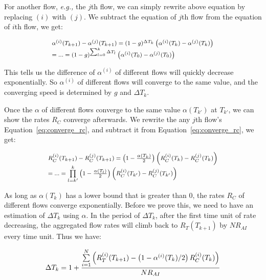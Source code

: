 For another flow, {\em e.g.,} the $j$th flow, we can simply rewrite above equation by replacing 
$(i)$ with $(j)$. We subtract the equation of $j$th flow from the equation of $i$th flow, we get:

\begin{equation}
\small
\begin{array}{l}
{\alpha ^{(i)}}({T_{k + 1}}) - {\alpha ^{(j)}}({T_{k + 1}}) = {(1 - g)^{\Delta {T_k}}}\left( {{\alpha ^{(i)}}({T_k}) - {\alpha ^{(j)}}({T_k})} \right)\\
 = ... = {(1 - g)^{\sum\nolimits_{l = 0}^k {\Delta {T_l}} }}\left( {{\alpha ^{(i)}}({T_0}) - {\alpha ^{(j)}}({T_0})} \right)
\end{array}
\end{equation}

This tells us the difference of $\alpha^{(i)}$ of different flows will quickly decrease exponentially. So $\alpha^{(i)}$
of different flows will converge to the same value, and the converging speed is determined by $g$ and
$\Delta T_k$. 

Once the $\alpha$ of different flows converge to the same value $\alpha(T_{k'})$ at $T_{k'}$, we can show 
the rates $R_C$ converge afterwards. We rewrite the any $j$th flow's Equation~\ref{eq:converge_rc}, and subtract it 
from Equation~\ref{eq:converge_rc}, we get:

\begin{equation}
\small
\begin{array}{l}
R_C^{(i)}({T_{k + 1}}) - R_C^{(j)}({T_{k + 1}}) = \left( {1 - \frac{{\alpha ({T_k})}}{2}} \right)\left( {R_C^{(i)}({T_k}) - R_C^{(j)}({T_k})} \right)\\
 = ... = \prod\limits_{l = k'}^k {\left( {1 - \frac{{\alpha ({T_l})}}{2}} \right)} \left( {R_C^{(i)}({T_{k'}}) - R_C^{(j)}({T_{k'}})} \right)
\end{array}
\label{eq:converge}
\end{equation}

As long as $\alpha ({T_k})$ has a lower bound that is greater than 0, the rates $R_C$ of different flows 
converge exponentially. Before we prove this, we need to have an estimation of $\Delta T_k$ using $\alpha$.
In the period of $\Delta T_k$, after the first time unit of rate decreasing, the aggregated flow rates
will climb back to $R_T(T_{k+1})$ by $NR_{AI}$ every time unit. Thus we have:

\begin{equation}
\small\Delta {T_k} = 1 + \frac{{\sum\limits_{i = 1}^N {\left( {R_T^{(i)}({T_{k + 1}}) - \left( {1 - {\alpha ^{(i)}}({T_k})/2} \right)R_C^{(i)}({T_k})} \right)} }}{{N{R_{AI}}}}
\end{equation}

